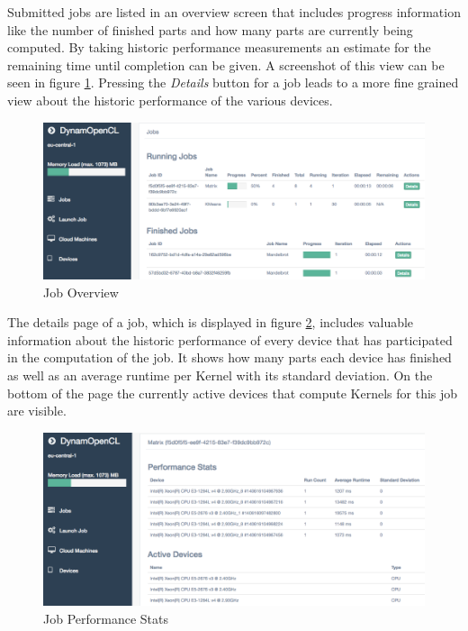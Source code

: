 Submitted jobs are listed in an overview screen that includes progress information like the number of finished parts and how many parts are currently being computed. By taking historic performance measurements an estimate for the remaining time until completion can be given. A screenshot of this view can be seen in figure \ref{img:job_overview}. Pressing the \textit{Details} button for a job leads to a more fine grained view about the historic performance of the various devices.

\begin{figure}[H]
	\includegraphics[width=1\textwidth]{screenshots/job_overview.png}
	\centering
	\caption{Job Overview}
	\label{img:job_overview}
\end{figure}

The details page of a job, which is displayed in figure \ref{img:job_details}, includes valuable information about the historic performance of every device that has participated in the computation of the job. It shows how many parts each device has finished as well as an average runtime per Kernel with its standard deviation. On the bottom of the page the currently active devices that compute Kernels for this job are visible.

\begin{figure}[H]
	\includegraphics[width=1\textwidth]{screenshots/job_details.png}
	\centering
	\caption{Job Performance Stats}
	\label{img:job_details}
\end{figure}

